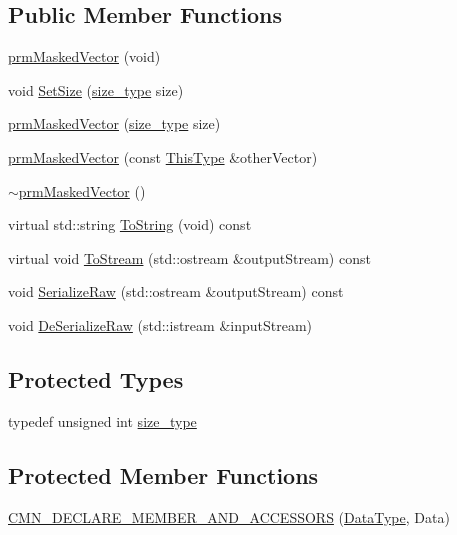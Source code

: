 \subsection*{Public Member Functions}
\begin{DoxyCompactItemize}
\item 
\hyperlink{classprm_masked_vector_ada7aa5c53340ac59a4531d2b4964689c}{prm\+Masked\+Vector} (void)
\item 
void \hyperlink{classprm_masked_vector_a4a77f03b68057a6d0b14d3203f5997e7}{Set\+Size} (\hyperlink{classprm_masked_vector_af5110e0749d68ef7b7424a11d746b964}{size\+\_\+type} size)
\item 
\hyperlink{classprm_masked_vector_a46ced5abe7ba852a5af6f0ed0d8b6d52}{prm\+Masked\+Vector} (\hyperlink{classprm_masked_vector_af5110e0749d68ef7b7424a11d746b964}{size\+\_\+type} size)
\item 
\hyperlink{classprm_masked_vector_ade8f33a543fc09f8f8be8da593cabe96}{prm\+Masked\+Vector} (const \hyperlink{classprm_masked_vector_aaa6c739a3050e8d46d9a7234ed4edc69}{This\+Type} \&other\+Vector)
\item 
\hyperlink{classprm_masked_vector_a3b1157749b45de893b174e20634167ef}{$\sim$prm\+Masked\+Vector} ()
\item 
virtual std\+::string \hyperlink{classprm_masked_vector_aa07ac569137cf382fa4fb0b9322254c1}{To\+String} (void) const 
\item 
virtual void \hyperlink{classprm_masked_vector_a9e470ac2eec3971ad0865bdacce96097}{To\+Stream} (std\+::ostream \&output\+Stream) const 
\item 
void \hyperlink{classprm_masked_vector_a15ca5ad95407f9ffca4a020d275bcaa2}{Serialize\+Raw} (std\+::ostream \&output\+Stream) const 
\item 
void \hyperlink{classprm_masked_vector_a8513f8bf845fb2f4c77c04c31ad301b5}{De\+Serialize\+Raw} (std\+::istream \&input\+Stream)
\end{DoxyCompactItemize}
\subsection*{Protected Types}
\begin{DoxyCompactItemize}
\item 
typedef unsigned int \hyperlink{classprm_masked_vector_af5110e0749d68ef7b7424a11d746b964}{size\+\_\+type}
\end{DoxyCompactItemize}
\subsection*{Protected Member Functions}
{\bf }\par
\begin{DoxyCompactItemize}
\item 
\hyperlink{classprm_masked_vector_a751b1ea008184ee4dd4d06b846a1386c}{C\+M\+N\+\_\+\+D\+E\+C\+L\+A\+R\+E\+\_\+\+M\+E\+M\+B\+E\+R\+\_\+\+A\+N\+D\+\_\+\+A\+C\+C\+E\+S\+S\+O\+R\+S} (\hyperlink{classprm_masked_vector_a7699da34296337db788196d01482defb}{Data\+Type}, Data)
\end{DoxyCompactItemize}

